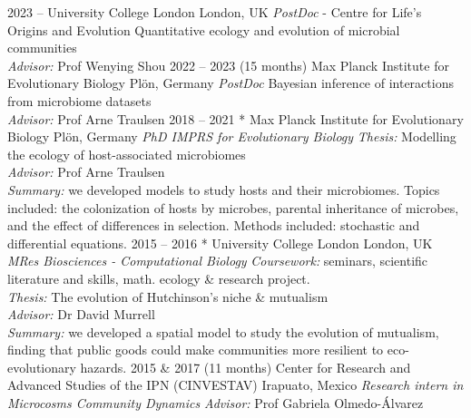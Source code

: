 \documentclass[]{friggeri-cv} %
\begin{document}
\begin{entrylist}
\entry
{2023 -- }
{}
{University College London}
{London, UK}
{{\normalsize\emph{PostDoc} - Centre for Life's Origins and Evolution}}
{Quantitative ecology and evolution of microbial communities \\ \emph{Advisor:}  Prof Wenying Shou}
\entry
{2022 -- 2023 }
{(15 months)}
{Max Planck Institute for Evolutionary Biology}
{Plön, Germany}
{{\normalsize\emph{PostDoc}}}
{Bayesian inference of interactions from microbiome datasets \\ \emph{Advisor:}  Prof Arne Traulsen}
\entry
{2018 -- 2021}
{}
{* Max Planck Institute for Evolutionary Biology}
{Plön, Germany}
{{\normalsize\emph{PhD {\normalfont IMPRS for Evolutionary Biology}}}}
{\emph{Thesis:} Modelling the ecology of host-associated microbiomes \\ \emph{Advisor:}  Prof Arne Traulsen \\ \emph{Summary:} we developed models to study hosts and their microbiomes. Topics included: the colonization of hosts by microbes, parental inheritance of microbes, and the effect of differences in selection. Methods included: stochastic and differential equations. }%
\entry
{2015 -- 2016}
{}
{* University College London}
{London, UK}
{{\normalsize\emph{MRes {\normalfont Biosciences - Computational Biology}}} }
{\emph{Coursework:} seminars, scientific literature and skills, math. ecology \& research project. \\
\emph{Thesis:} The evolution of Hutchinson’s niche \& mutualism \\ \emph{Advisor:} Dr David Murrell \\ \emph{Summary:} we developed a spatial model to study the evolution of mutualism, finding that public goods could make communities more resilient to eco-evolutionary hazards.}
\entry
{2015 \& 2017}
{(11 months)}
{Center for Research and Advanced Studies of the IPN (CINVESTAV)}
{Irapuato, Mexico}
{{\normalsize\emph{Research intern in Microcosms Community Dynamics}}}
{\emph{Advisor:} Prof Gabriela Olmedo-Álvarez }%

\end{entrylist}
\end{document}
